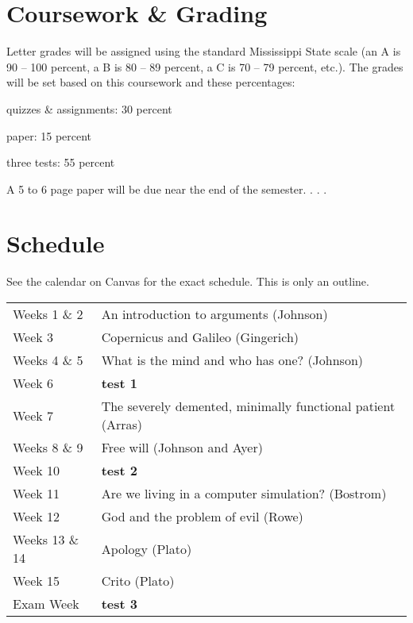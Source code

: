 \documentclass[11pt,oneside]{article}
\begin{document}
\section{Coursework \& Grading}

Letter grades will be assigned using the standard Mississippi State scale (an A is 90 – 100 percent, a B is 80 – 89 percent, a C is 70 – 79 percent, etc.). The grades will be set based on this coursework and these percentages:
\begin{description}
\item quizzes \& assignments: 30 percent
\item paper: 15 percent
\item three tests: 55 percent
\end{description}

A 5 to 6 page paper will be due near the end of the semester. . . .








\section{Schedule}

\begin{minipage}{\textwidth}
See the calendar on Canvas for the exact schedule. This is only an outline.

\vspace{3mm}
\begin{tabular}{@{}ll@{}}
\midrule
Weeks 1 \& 2 & An introduction to arguments (Johnson)\\
Week 3 & Copernicus and Galileo (Gingerich)\\ 
Weeks 4 \& 5 & What is the mind and who has one? (Johnson)\\
Week 6 & \textbf{test 1}\\
Week 7 & The severely demented, minimally functional patient (Arras)\\
Weeks 8 \& 9 & Free will (Johnson and Ayer)\\ 
Week 10 & \textbf{test 2}\\
Week 11 & Are we living in a computer simulation? (Bostrom)\\
Week 12 & God and the problem of evil (Rowe)\\
Weeks 13 \& 14 & Apology (Plato)\\
Week 15 & Crito (Plato)\\
Exam Week & \textbf{test 3}\\
\midrule
\end{tabular}
\vspace{3mm}
\end{minipage}








\end{document}

